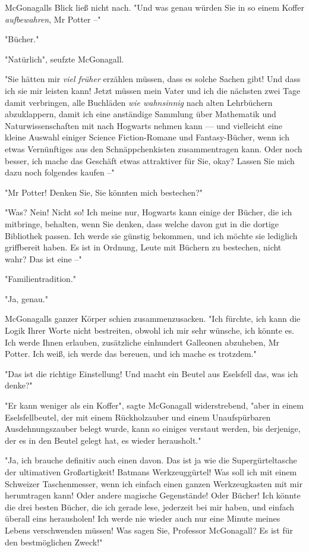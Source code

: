 {McGonagalls Blick ließ nicht nach. "Und was genau würden Sie in so einem Koffer \emph{aufbewahren}, Mr Potter --"

"Bücher."

"Natürlich", seufzte McGonagall.

"Sie hätten mir \emph{viel früher} erzählen müssen, dass es solche Sachen gibt! Und dass ich sie mir leisten kann! Jetzt müssen mein Vater und ich die nächsten zwei Tage damit verbringen, alle Buchläden \emph{wie wahnsinnig} nach alten Lehrbüchern abzuklappern, damit ich eine anständige Sammlung über Mathematik und Naturwissenschaften mit nach Hogwarts nehmen kann --- und vielleicht eine kleine Auswahl einiger Science Fiction-Romane und Fantasy-Bücher, wenn ich etwas Vernünftiges aus den Schnäppchenkisten zusammentragen kann. Oder noch besser, ich mache das Geschäft etwas attraktiver für Sie, okay? Lassen Sie mich dazu noch folgendes kaufen --"

"Mr Potter! Denken Sie, Sie könnten mich bestechen?"

"Was? Nein! Nicht so! Ich meine nur, Hogwarts kann einige der Bücher, die ich mitbringe, behalten, wenn Sie denken, dass welche davon gut in die dortige Bibliothek passen. Ich werde sie günstig bekommen, und ich möchte sie lediglich griffbereit haben. Es ist in Ordnung, Leute mit Büchern zu bestechen, nicht wahr? Das ist eine --"

"Familientradition."

"Ja, genau."

McGonagalls ganzer Körper schien zusammenzusacken. "Ich fürchte, ich kann die Logik Ihrer Worte nicht bestreiten, obwohl ich mir sehr wünsche, ich könnte es. Ich werde Ihnen erlauben, zusätzliche einhundert Galleonen abzuheben, Mr Potter. Ich weiß, ich werde das bereuen, und ich mache es trotzdem."

"Das ist die richtige Einstellung! Und macht ein Beutel aus Eselsfell das, was ich denke?"

"Er kann weniger als ein Koffer", sagte McGonagall widerstrebend, "aber in einem Eselsfellbeutel, der mit einem Rückholzauber und einem Unaufspürbaren Ausdehnungszauber belegt wurde, kann so einiges verstaut werden, bis derjenige, der es in den Beutel gelegt hat, es wieder herausholt."

"Ja, ich brauche definitiv auch einen davon. Das ist ja wie die Supergürteltasche der ultimativen Großartigkeit! Batmans Werkzeuggürtel! Was soll ich mit einem Schweizer Taschenmesser, wenn ich einfach einen ganzen Werkzeugkasten mit mir herumtragen kann! Oder andere magische Gegenstände! Oder Bücher! Ich könnte die drei besten Bücher, die ich gerade lese, jederzeit bei mir haben, und einfach überall eins herausholen! Ich werde nie wieder auch nur eine Minute meines Lebens verschwenden müssen! Was sagen Sie, Professor McGonagall? Es ist für den bestmöglichen Zweck!"

}
